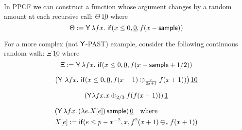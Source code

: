 \iffalse
Sampling from continuous distributions is an essential feature of statistical probabilistic programming languages. (See e.g.~Church \citep{DBLP:conf/uai/GoodmanMRBT08}, Stan \citep{carpenter2017stan}, Anglican \citep{DBLP:conf/pkdd/TolpinMW15}, Gen \citep{cusumano-towner2019Gen}, Pyro \citep{bingham2019Pyro}, Edward \citep{tran2016edward} and Turing \citep{ge2018Turing}.)
Methods of proving AST of probabilistic computation have been developed for probabilistic programs with discrete distributions (see e.g.~\cite{DBLP:journals/toplas/LagoG19,DBLP:journals/jacm/KaminskiKMO18,DBLP:conf/lics/OlmedoKKM16,DBLP:conf/lics/KobayashiLG19,DBLP:conf/mfcs/KaminskiK15,DBLP:series/mcs/McIverM05}).
To our knowledge, the problem of proving AST of probabilistic functional programs with continuous distribution is new.
\fi

\begin{example}\label{ex:raven complex}
In PPCF we can construct a function whose argument changes by a random amount at each recursive call: $\Theta \, \underline{10}$ where
\[
\Theta := \mathsf{Y} \, \lambda f x .\ \mathsf{if}(x \leq 0, \underline 0, f(x - \mathsf{sample}))
\]

For a more complex (not $\mathsf{Y}$-PAST) example, consider the following continuous random walk: $\Xi \, \underline{10}$ where
\[
\Xi := \mathsf{Y} \, \lambda f x .\ \mathsf{if}(x \leq 0, \underline 0, f(x - \mathsf{sample} + 1/2)) 
\]
\end{example}

\begin{example}
\label{ex:Fair-in-the-limit random walk}\cite[\S 5.3]{DBLP:journals/pacmpl/McIverMKK18}
\[
\big
(\tY\ \lambda f x .\ 
\tif{x \leq 0}{\underline 0}{f(x - 1) \oplus_{\frac{x}{2x+1}} f(x + 1)} \big)
\, \underline{10}
\]
\end{example}

\begin{example}
\label{ex:non-affine recursion easy}
\[
(\mathsf{Y} \lambda f x. x \oplus_{2/3} f (f (x + 1)))\, \underline 1
\]
\end{example}

\begin{example}
\label{ex:non-affine continuous}
\begin{align*}
& (\mathsf{Y}\, \lambda f x.\, (\lambda e. X[e]) \, \mathsf{sample})\, \underline 0 \quad \hbox{where}\\
& X[e] := \mathsf{if}(e \leq p - x^{-2}, x, f^2(x+1) \oplus_e f(x+1))
\end{align*}
\end{example}

